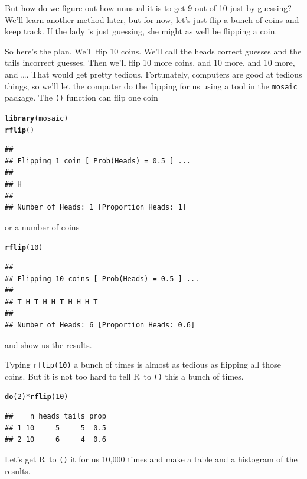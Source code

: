 \documentclass[twoside]{book}\usepackage[]{graphicx}\usepackage[]{xcolor}
\makeatletter
\newcommand{\hlnum}[1]{\textcolor[rgb]{0.686,0.059,0.569}{#1}}%
\newcommand{\hlopt}[1]{\textcolor[rgb]{0,0,0}{#1}}%
\newcommand{\hlstd}[1]{\textcolor[rgb]{0.345,0.345,0.345}{#1}}%
\newcommand{\hlkwd}[1]{\textcolor[rgb]{0.737,0.353,0.396}{\textbf{#1}}}%
\newenvironment{kframe}{%
 \def\at@end@of@kframe{}%
 \ifinner\ifhmode%
  \def\at@end@of@kframe{\end{minipage}}%
  \begin{minipage}{\columnwidth}%
 \fi\fi%
 \def\FrameCommand##1{\hskip\@totalleftmargin \hskip-\fboxsep
 \colorbox{shadecolor}{##1}\hskip-\fboxsep
     \hskip-\linewidth \hskip-\@totalleftmargin \hskip\columnwidth}%
 \MakeFramed {\advance\hsize-\width
   \@totalleftmargin\z@ \linewidth\hsize
   \@setminipage}}%
 {\par\unskip\endMakeFramed%
 \at@end@of@kframe}
\newenvironment{knitrout}{}{} %
\newcommand{\Rindex}[1]{\index{\texttt{#1}}}
\newcommand{\function}[1]{{\color{purple!75!blue}\texttt{\StrSubstitute{#1}{()}{}()}}\Rindex{#1}}
\newcommand{\pkg}[1]{{\color{red!80!black}\texttt{#1}}\Rindex{#1}}
\renewcommand{\code}[1]{{\color{blue!80!black}\texttt{#1}}}
\def\R{{\sf R}}
\makeatother
\begin{document}
But how do we figure out how unusual it is to get 9 out of 10 just by 
guessing?  We'll learn another method later, but for now, let's just 
flip a bunch of coins and keep track.  If the lady is just guessing, she 
might as well be flipping a coin.

So here's the plan.  We'll flip 10 coins.  We'll call the heads correct 
guesses and the tails incorrect guesses.  Then we'll flip 10 more coins,
and 10 more, and 10 more, and \dots.  That would get pretty tedious.
Fortunately, computers are good at tedious things, so we'll let the computer 
do the flipping for us using a tool in the \pkg{mosaic} package.
The \function{rflip()} function can flip one coin

\begin{knitrout}
\color{fgcolor}\begin{kframe}
\begin{alltt}
\hlkwd{library}\hlstd{(mosaic)}
\hlkwd{rflip}\hlstd{()}
\end{alltt}
\begin{verbatim}
## 
## Flipping 1 coin [ Prob(Heads) = 0.5 ] ...
## 
## H
## 
## Number of Heads: 1 [Proportion Heads: 1]
\end{verbatim}
\end{kframe}
\end{knitrout}
or a number of coins
\begin{knitrout}
\color{fgcolor}\begin{kframe}
\begin{alltt}
\hlkwd{rflip}\hlstd{(}\hlnum{10}\hlstd{)}
\end{alltt}
\begin{verbatim}
## 
## Flipping 10 coins [ Prob(Heads) = 0.5 ] ...
## 
## T H T H H T H H H T
## 
## Number of Heads: 6 [Proportion Heads: 0.6]
\end{verbatim}
\end{kframe}
\end{knitrout}
and show us the results.

Typing \code{rflip(10)} a bunch of times is almost as tedious as 
flipping all those coins.   But it is not too hard to 
tell \R\ to \function{do()} this a bunch of times.
\begin{knitrout}
\color{fgcolor}\begin{kframe}
\begin{alltt}
\hlkwd{do}\hlstd{(}\hlnum{2}\hlstd{)} \hlopt{*} \hlkwd{rflip}\hlstd{(}\hlnum{10}\hlstd{)}
\end{alltt}
\begin{verbatim}
##    n heads tails prop
## 1 10     5     5  0.5
## 2 10     6     4  0.6
\end{verbatim}
\end{kframe}
\end{knitrout}
Let's get \R\ to \function{do()} it for us 10,000 times and make 
a table and a histogram of the results.
\end{document}
